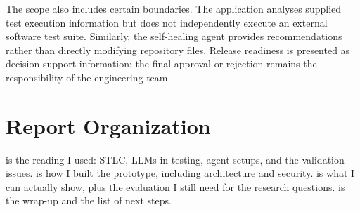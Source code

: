 The scope also includes certain boundaries. The application analyses supplied test execution information but does not independently execute an external software test suite. Similarly, the self-healing agent provides recommendations rather than directly modifying repository files. Release readiness is presented as decision-support information; the final approval or rejection remains the responsibility of the engineering team.

\section{Report Organization}
 is the reading I used: STLC, LLMs in testing, agent setups, and the validation issues.  is how I built the prototype, including architecture and security.  is what I can actually show, plus the evaluation I still need for the research questions.  is the wrap-up and the list of next steps.
